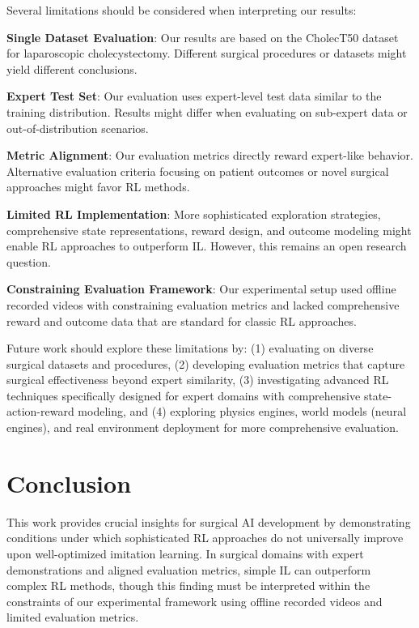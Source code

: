 \documentclass[runningheads]{llncs}
\begin{document}
Several limitations should be considered when interpreting our results:

\textbf{Single Dataset Evaluation}: Our results are based on the CholecT50 dataset for laparoscopic cholecystectomy. Different surgical procedures or datasets might yield different conclusions.

\textbf{Expert Test Set}: Our evaluation uses expert-level test data similar to the training distribution. Results might differ when evaluating on sub-expert data or out-of-distribution scenarios.

\textbf{Metric Alignment}: Our evaluation metrics directly reward expert-like behavior. Alternative evaluation criteria focusing on patient outcomes or novel surgical approaches might favor RL methods.

\textbf{Limited RL Implementation}: More sophisticated exploration strategies, comprehensive state representations, reward design, and outcome modeling might enable RL approaches to outperform IL. However, this remains an open research question.

\textbf{Constraining Evaluation Framework}: Our experimental setup used offline recorded videos with constraining evaluation metrics and lacked comprehensive reward and outcome data that are standard for classic RL approaches.

Future work should explore these limitations by: (1) evaluating on diverse surgical datasets and procedures, (2) developing evaluation metrics that capture surgical effectiveness beyond expert similarity, (3) investigating advanced RL techniques specifically designed for expert domains with comprehensive state-action-reward modeling, and (4) exploring physics engines, world models (neural engines), and real environment deployment for more comprehensive evaluation.


\section{Conclusion}

This work provides crucial insights for surgical AI development by demonstrating conditions under which sophisticated RL approaches do not universally improve upon well-optimized imitation learning. In surgical domains with expert demonstrations and aligned evaluation metrics, simple IL can outperform complex RL methods, though this finding must be interpreted within the constraints of our experimental framework using offline recorded videos and limited evaluation metrics.
\end{document}

